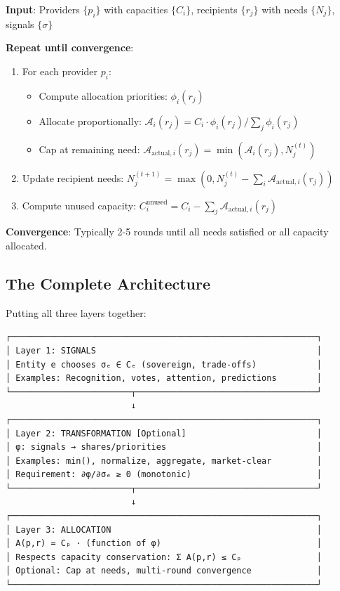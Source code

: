 \documentclass[11pt,a4paper]{article}
\theoremstyle{definition}
\theoremstyle{remark}
\newcommand{\A}{\mathcal{A}}
\begin{document}
\begin{algorithm}
\textbf{Input}: Providers $\{p_i\}$ with capacities $\{C_i\}$, recipients $\{r_j\}$ with needs $\{N_j\}$, signals $\{\sigma\}$

\textbf{Repeat until convergence}:
\begin{enumerate}
\item For each provider $p_i$:
   \begin{itemize}
   \item Compute allocation priorities: $\phi_i(r_j)$
   \item Allocate proportionally: $\A_i(r_j) = C_i \cdot \phi_i(r_j) / \sum_j \phi_i(r_j)$
   \item Cap at remaining need: $\A_{\text{actual},i}(r_j) = \min(\A_i(r_j), N_j^{(t)})$
   \end{itemize}
\item Update recipient needs: $N_j^{(t+1)} = \max(0, N_j^{(t)} - \sum_i \A_{\text{actual},i}(r_j))$
\item Compute unused capacity: $C_i^{\text{unused}} = C_i - \sum_j \A_{\text{actual},i}(r_j)$
\end{enumerate}

\textbf{Convergence}: Typically 2-5 rounds until all needs satisfied or all capacity allocated.
\end{algorithm}

\subsection{The Complete Architecture}

Putting all three layers together:

\begin{center}
\begin{verbatim}
┌─────────────────────────────────────────────────────────────┐
│ Layer 1: SIGNALS                                            │
│ Entity e chooses σₑ ∈ Cₑ (sovereign, trade-offs)            │
│ Examples: Recognition, votes, attention, predictions        │
└────────────────────────┬────────────────────────────────────┘
                         ↓
┌─────────────────────────────────────────────────────────────┐
│ Layer 2: TRANSFORMATION [Optional]                          │
│ φ: signals → shares/priorities                              │
│ Examples: min(), normalize, aggregate, market-clear         │
│ Requirement: ∂φ/∂σₑ ≥ 0 (monotonic)                         │
└────────────────────────┬────────────────────────────────────┘
                         ↓
┌─────────────────────────────────────────────────────────────┐
│ Layer 3: ALLOCATION                                         │
│ A(p,r) = Cₚ · (function of φ)                               │
│ Respects capacity conservation: Σ A(p,r) ≤ Cₚ               │
│ Optional: Cap at needs, multi-round convergence             │
└─────────────────────────────────────────────────────────────┘
\end{verbatim}
\end{center}
\end{document}
